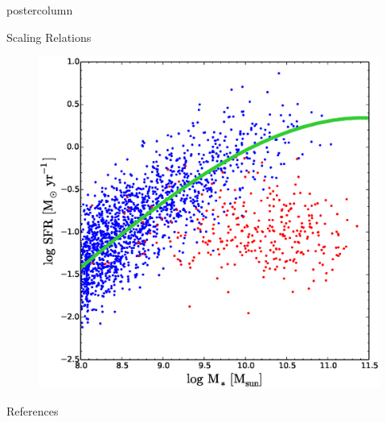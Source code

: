 \documentclass{beamer}
\begin{document}
\begin{frame}
\begin{columns}
\begin{column}{.5\textwidth}
\begin{beamercolorbox}[center,wd=\textwidth]{postercolumn}
\begin{minipage}[T]{.95\textwidth}
{\begin{myblock}{\LARGE Scaling Relations}
\begin{figure}
\begin{minipage}{0.32\textwidth}
								\caption{}
							\end{minipage}
							\begin{minipage}{0.32\textwidth}
								\centering\includegraphics[width=\textwidth]{img/MSFR.eps}
								\caption{\cite{saintonge2016SFRMstar}}
							\end{minipage}
						\end{figure}
					\end{myblock}\vfill
					\begin{myblock}{\LARGE References}
						\footnotesize
						
						
					\end{myblock}\vfill
		}\end{minipage}\end{beamercolorbox}
	\end{column}
\end{columns}
\end{frame}
\end{document}
